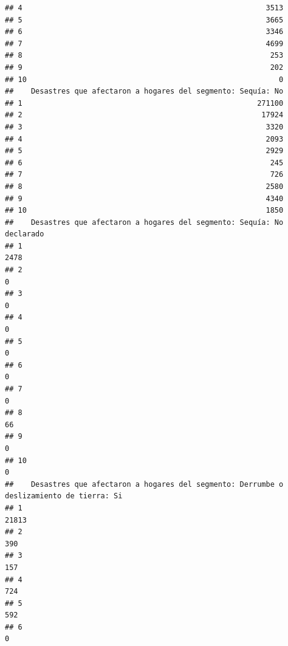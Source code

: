 \documentclass[11pt,]{article}
\begin{document}
\begin{verbatim}
## 4                                                        3513
## 5                                                        3665
## 6                                                        3346
## 7                                                        4699
## 8                                                         253
## 9                                                         202
## 10                                                          0
##    Desastres que afectaron a hogares del segmento: Sequía: No
## 1                                                      271100
## 2                                                       17924
## 3                                                        3320
## 4                                                        2093
## 5                                                        2929
## 6                                                         245
## 7                                                         726
## 8                                                        2580
## 9                                                        4340
## 10                                                       1850
##    Desastres que afectaron a hogares del segmento: Sequía: No declarado
## 1                                                                  2478
## 2                                                                     0
## 3                                                                     0
## 4                                                                     0
## 5                                                                     0
## 6                                                                     0
## 7                                                                     0
## 8                                                                    66
## 9                                                                     0
## 10                                                                    0
##    Desastres que afectaron a hogares del segmento: Derrumbe o deslizamiento de tierra: Si
## 1                                                                                   21813
## 2                                                                                     390
## 3                                                                                     157
## 4                                                                                     724
## 5                                                                                     592
## 6                                                                                       0

\end{verbatim}
\end{document}
